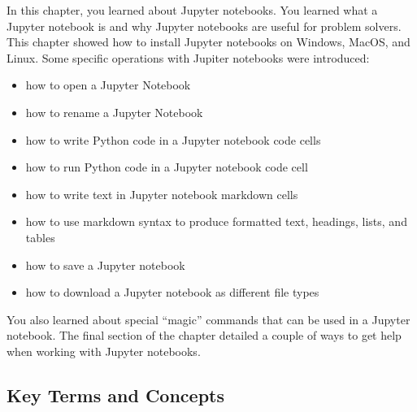 \documentclass{book}
\providecommand{\tightlist}{%
      \setlength{\itemsep}{0pt}\setlength{\parskip}{0pt}}
\begin{document}
    




    
        In this chapter, you learned about Jupyter notebooks. You learned what a
Jupyter notebook is and why Jupyter notebooks are useful for problem
solvers. This chapter showed how to install Jupyter notebooks on
Windows, MacOS, and Linux. Some specific operations with Jupiter
notebooks were introduced:

\begin{itemize}
\tightlist
\item
  how to open a Jupyter Notebook
\item
  how to rename a Jupyter Notebook
\item
  how to write Python code in a Jupyter notebook code cells
\item
  how to run Python code in a Jupyter notebook code cell
\item
  how to write text in Jupyter notebook markdown cells
\item
  how to use markdown syntax to produce formatted text, headings, lists,
  and tables
\item
  how to save a Jupyter notebook
\item
  how to download a Jupyter notebook as different file types
\end{itemize}

You also learned about special ``magic'' commands that can be used in a
Jupyter notebook. The final section of the chapter detailed a couple of
ways to get help when working with Jupyter notebooks.
    




    
        \hypertarget{key-terms-and-concepts}{%
\subsection{Key Terms and Concepts}\label{key-terms-and-concepts}}
    
\end{document}
